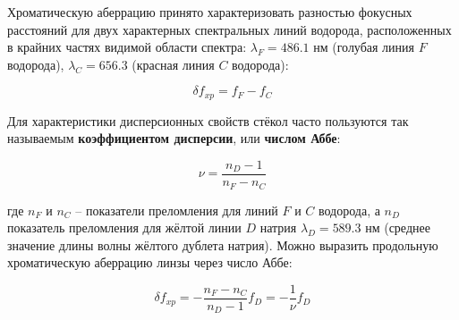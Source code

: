 	Хроматическую аберрацию принято характеризовать разностью фокусных расстояний для двух характерных спектральных линий водорода, расположенных в крайних частях видимой области спектра: $\lambda_F = 486.1$ нм (голубая линия $F$ водорода), $\lambda_C = 656.3$ (красная линия $C$ водорода):
	
	\begin{equation} \label{eq:chromatic_aberation}
		\delta f_{xp} = f_F - f_C
	\end{equation}

	Для характеристики дисперсионных свойств стёкол часто пользуются так называемым \textbf{коэффициентом дисперсии}, или \textbf{числом Аббе}:
	
	\begin{equation} \label{eq:Abbe_constant}
		\nu = \frac{n_D - 1}{n_F - n_C}
	\end{equation}
	
	где $n_F$ и $n_C$ -- показатели преломления для линий $F$ и $C$ водорода, а $n_D$ показатель преломления для жёлтой линии $D$ натрия $\lambda_D = 589.3$ нм (среднее значение длины волны жёлтого дублета натрия). Можно выразить продольную хроматическую аберрацию линзы через число Аббе:
	
	\begin{equation}
		\delta f_{xp} = - \frac{n_F - n_C}{n_D - 1} f_D = - \frac{1}{\nu} f_D
	\end{equation}
